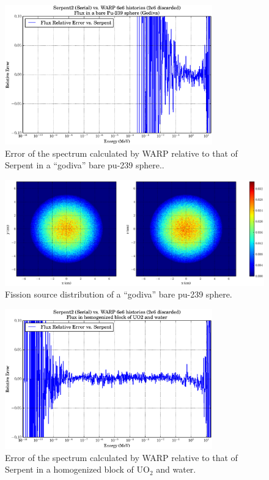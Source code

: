\begin{figure}[h!] 
\centering
\includegraphics[width=0.8\textwidth]{graphics/finalresults/godiva_spec_err.eps}
\caption{Error of the spectrum calculated by WARP relative to that of Serpent in a ``godiva'' bare pu-239 sphere.. \label{godiva_spec_err} }
\end{figure}

\begin{figure}[h!]
\centering
\includegraphics[width=\textwidth]{graphics/finalresults/godiva_fiss.eps}
\caption{Fission source distribution of a ``godiva'' bare pu-239 sphere. \label{godiva_fiss} }
\end{figure}

\begin{figure}[h!] 
\centering
\includegraphics[width=0.8\textwidth]{graphics/finalresults/homfuel_spec_err.eps}
\caption{Error of the spectrum calculated by WARP relative to that of Serpent in a homogenized block of UO$_2$ and water. \label{homfuel_spec_err} }
\end{figure}

